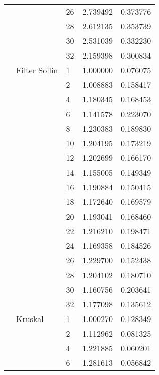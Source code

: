 \begin{tabular}{lllrr}
                      &            & 26 &  2.739492 &  0.373776 \\
                      &            & 28 &  2.612135 &  0.353739 \\
                      &            & 30 &  2.531039 &  0.332230 \\
                      &            & 32 &  2.159398 &  0.300834 \\
                      & Filter Sollin & 1  &  1.000000 &  0.076075 \\
                      &            & 2  &  1.008883 &  0.158417 \\
                      &            & 4  &  1.180345 &  0.168453 \\
                      &            & 6  &  1.141578 &  0.223070 \\
                      &            & 8  &  1.230383 &  0.189830 \\
                      &            & 10 &  1.204195 &  0.173219 \\
                      &            & 12 &  1.202699 &  0.166170 \\
                      &            & 14 &  1.155005 &  0.149349 \\
                      &            & 16 &  1.190884 &  0.150415 \\
                      &            & 18 &  1.172640 &  0.169579 \\
                      &            & 20 &  1.193041 &  0.168460 \\
                      &            & 22 &  1.216210 &  0.198471 \\
                      &            & 24 &  1.169358 &  0.184526 \\
                      &            & 26 &  1.229700 &  0.152438 \\
                      &            & 28 &  1.204102 &  0.180710 \\
                      &            & 30 &  1.160756 &  0.203641 \\
                      &            & 32 &  1.177098 &  0.135612 \\
                      & Kruskal & 1  &  1.000270 &  0.128349 \\
                      &            & 2  &  1.112962 &  0.081325 \\
                      &            & 4  &  1.221885 &  0.060201 \\
                      &            & 6  &  1.281613 &  0.056842 \\

\end{tabular}
